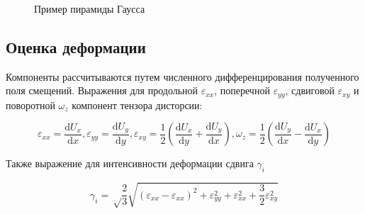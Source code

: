 \begin{figure}[ht]
\caption{Пример пирамиды Гаусса}
\label{pic:pyramid}
\end{figure}

\subsection{Оценка деформации}

Компоненты рассчитываются путем численного дифференцирования полученного поля смещений. Выражения для продольной $\varepsilon_{xx}$, поперечной $\varepsilon_{yy}$, сдвиговой $\varepsilon_{xy}$ и поворотной $\omega_z$ компонент тензора дисторсии:

$$\varepsilon_{xx}= \frac{\mathrm{d} U_x}{\mathrm{d} x},\varepsilon_{yy}= \frac{\mathrm{d} U_y}{\mathrm{d} y},\varepsilon_{xy}=\frac{1}{2}(\frac{\mathrm{d} U_x}{\mathrm{d} y} + \frac{\mathrm{d} U_y}{\mathrm{d} x}),\omega_z=\frac{1}{2}(\frac{\mathrm{d} U_y}{\mathrm{d} x} - \frac{\mathrm{d} U_x}{\mathrm{d} y})$$

Также выражение для интенсивности деформации сдвига $\gamma_i$

$$\gamma_i = \sqrt\frac{2}{3}\sqrt{(\varepsilon_{xx}-\varepsilon_{xx})^2+\varepsilon_{yy}^2+\varepsilon_{xx}^2 + \frac{3}{2}\varepsilon_{xy}^2}$$
